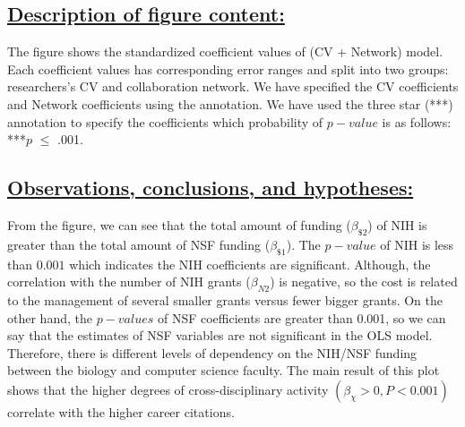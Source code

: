 \documentclass{article}\usepackage[]{graphicx}\usepackage[]{color}
\begin{document}
\subsection*{\underline{Description of figure content:}}
\par{
The figure shows the standardized coefficient values of (CV + Network) model. Each coefficient values has corresponding error ranges and split into two groups: researchers's CV and collaboration network. We have specified the CV coefficients and Network coefficients using the annotation. We have used the three star (***) annotation to specify the coefficients which probability of $p-value$ is as follows: ***$\textit{p}$ $\leq$ .001.
}
\subsection*{\underline{Observations, conclusions, and hypotheses:}}
\par{
From the figure, we can see that the total amount of funding ($\beta_{\$2}$) of NIH is greater than the total amount of NSF funding ($\beta_{\$1}$). The $p-value$ of NIH is less than $0.001$ which indicates the NIH coefficients are significant. Although, the correlation with the number of NIH grants ($\beta_{N2}$) is negative, so the cost is related to the management of several smaller grants versus fewer bigger grants. On the other hand, the $p-values$ of NSF coefficients are greater than 0.001, so we can say that the estimates of NSF variables are not significant in the OLS model. Therefore, there is different levels of dependency on the NIH/NSF funding between the biology and computer science faculty. The main result of this plot shows that the higher degrees of cross-disciplinary activity $(\beta_{\chi} > 0, P < 0.001)$ correlate with the higher career citations.
}
\end{document}
